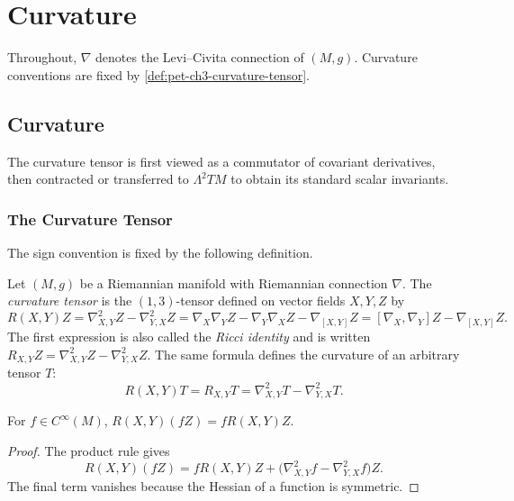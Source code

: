 \chapter{Curvature}
\label{chap:pet-curvature}

Throughout, $\nabla$ denotes the Levi--Civita connection of $(M,g)$. Curvature
conventions are fixed by \cref{def:pet-ch3-curvature-tensor}.

\section{Curvature}

The curvature tensor is first viewed as a commutator of covariant derivatives,
then contracted or transferred to $\Lambda^2TM$ to obtain its standard scalar
invariants.

\subsection{The Curvature Tensor}

The sign convention is fixed by the following definition.

\begin{definition}
  \label{def:pet-ch3-curvature-tensor}
  \leanok
  Let $(M,g)$ be a Riemannian manifold with Riemannian connection $\nabla$. The
  \emph{curvature tensor} is the $(1,3)$-tensor defined on vector fields $X,Y,Z$ by
  \[
    R(X,Y)Z=\nabla^2_{X,Y}Z-\nabla^2_{Y,X}Z
    =\nabla_X\nabla_YZ-\nabla_Y\nabla_XZ-\nabla_{[X,Y]}Z
    =[\nabla_X,\nabla_Y]Z-\nabla_{[X,Y]}Z.
  \]
  The first expression is also called the \emph{Ricci identity} and is written
  $R_{X,Y}Z=\nabla^2_{X,Y}Z-\nabla^2_{Y,X}Z$. The same formula defines the
  curvature of an arbitrary tensor $T$:
  \[
    R(X,Y)T=R_{X,Y}T=\nabla^2_{X,Y}T-\nabla^2_{Y,X}T.
  \]
\end{definition}

\begin{lemma}
  \label{lem:pet-ch3-curvature-tensor-tensorial}
  \leanok
  For $f\in C^\infty(M)$,
  $R(X,Y)(fZ)=fR(X,Y)Z$.
\end{lemma}
\begin{proof}
  \leanok
  \sketch
  The product rule gives
  \[
   R(X,Y)(fZ)=fR(X,Y)Z+
   \bigl(\nabla^2_{X,Y}f-\nabla^2_{Y,X}f\bigr)Z.
  \]
  The final term vanishes because the Hessian of a function is symmetric.
\end{proof}

